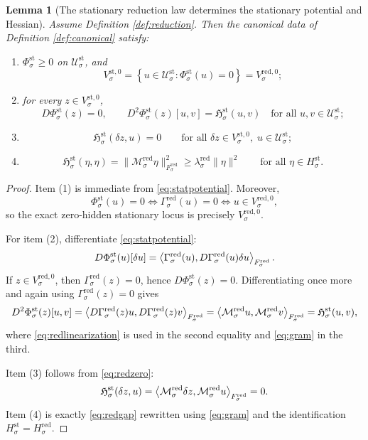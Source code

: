 \documentclass[11pt]{article}
\newcommand{\StatSpace}[1]{\mathcal U_{#1}^{\mathrm{st}}}
\newcommand{\StatPotential}[1]{\Phi_{#1}^{\mathrm{st}}}
\newcommand{\StatZero}[1]{V_{#1}^{\mathrm{st},0}}
\newcommand{\StatHidden}[1]{H_{#1}^{\mathrm{st}}}
\newcommand{\StatHess}[1]{\mathfrak H_{#1}^{\mathrm{st}}}
\newcommand{\RedTarget}[1]{F_{#1}^{\mathrm{red}}}
\newcommand{\RedMap}[1]{\Gamma_{#1}^{\mathrm{red}}}
\newcommand{\RedZero}[1]{V_{#1}^{\mathrm{red},0}}
\newcommand{\RedHidden}[1]{H_{#1}^{\mathrm{red}}}
\newcommand{\RedLin}[1]{\mathcal M_{#1}^{\mathrm{red}}}
\newtheorem{lemma}{Lemma}
\begin{document}
\begin{lemma}[The stationary reduction law determines the stationary potential and Hessian]
\label{lem:potential}
Assume Definition \ref{def:reduction}. Then the canonical data of Definition \ref{def:canonical} satisfy:
\begin{enumerate}
    \item \(\StatPotential{\sigma}\ge 0\) on \(\StatSpace{\sigma}\), and
    \[
    \StatZero{\sigma}
    =
    \left\{
    u\in\StatSpace{\sigma}:
    \StatPotential{\sigma}(u)=0
    \right\}
    =
    \RedZero{\sigma};
    \]
    \item for every \(z\in\StatZero{\sigma}\),
    \[
    D\StatPotential{\sigma}(z)=0,
    \qquad
    D^{2}\StatPotential{\sigma}(z)[u,v]
    =
    \StatHess{\sigma}(u,v)
    \quad
    \text{for all }u,v\in\StatSpace{\sigma};
    \]
    \item
    \[
    \StatHess{\sigma}(\delta z,u)=0
    \qquad
    \text{for all }\delta z\in\StatZero{\sigma},\;u\in\StatSpace{\sigma};
    \]
    \item
    \[
    \StatHess{\sigma}(\eta,\eta)
    =
    \|\RedLin{\sigma}\eta\|_{\RedTarget{\sigma}}^{2}
    \ge
    \lambda_{\sigma}^{\mathrm{red}}\|\eta\|^{2}
    \qquad
    \text{for all }\eta\in\StatHidden{\sigma}.
    \]
\end{enumerate}
\end{lemma}

\begin{proof}
Item (1) is immediate from \eqref{eq:statpotential}. Moreover,
\[
\StatPotential{\sigma}(u)=0
\iff
\RedMap{\sigma}(u)=0
\iff
u\in\RedZero{\sigma},
\]
so the exact zero-hidden stationary locus is precisely \(\RedZero{\sigma}\).

For item (2), differentiate \eqref{eq:statpotential}:
\[
D\StatPotential{\sigma}(u)[\delta u]
=
\ev{\RedMap{\sigma}(u),D\RedMap{\sigma}(u)\delta u}_{\RedTarget{\sigma}}.
\]
If \(z\in\RedZero{\sigma}\), then \(\RedMap{\sigma}(z)=0\), hence \(D\StatPotential{\sigma}(z)=0\). Differentiating once more and again using \(\RedMap{\sigma}(z)=0\) gives
\[
D^{2}\StatPotential{\sigma}(z)[u,v]
=
\ev{D\RedMap{\sigma}(z)u,D\RedMap{\sigma}(z)v}_{\RedTarget{\sigma}}
=
\ev{\RedLin{\sigma}u,\RedLin{\sigma}v}_{\RedTarget{\sigma}}
=
\StatHess{\sigma}(u,v),
\]
where \eqref{eq:redlinearization} is used in the second equality and \eqref{eq:gram} in the third.

Item (3) follows from \eqref{eq:redzero}:
\[
\StatHess{\sigma}(\delta z,u)
=
\ev{\RedLin{\sigma}\delta z,\RedLin{\sigma}u}_{\RedTarget{\sigma}}
=
0.
\]
Item (4) is exactly \eqref{eq:redgap} rewritten using \eqref{eq:gram} and the identification \(\StatHidden{\sigma}=\RedHidden{\sigma}\).
\end{proof}
\end{document}
